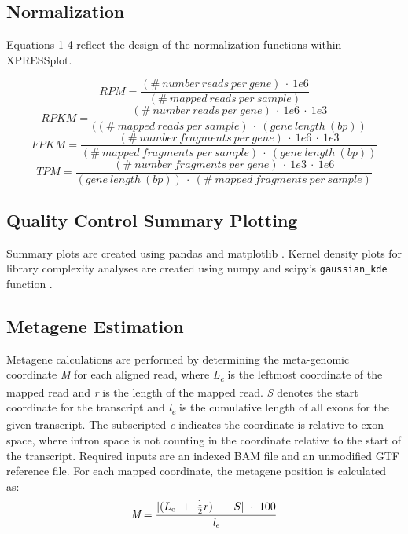 \documentclass[11pt, a4paper, oneside]{article}
\begin{document}
\subsection{Normalization}
Equations 1-4 reflect the design of the normalization functions within XPRESSplot.

  \begin{equation}
    RPM = \frac{(\#\ number\ reads\ per\ gene)\ \cdot\ 1e6}{(\#\ mapped\ reads\ per\ sample)}
  \end{equation}
  \begin{equation}
    RPKM = \frac{(\#\ number\ reads\ per\ gene)\ \cdot\ 1e6\ \cdot\ 1e3}{((\#\ mapped\ reads\ per\ sample)\ \cdot\ (gene\ length\ (bp))}
  \end{equation}
  \begin{equation}
    FPKM = \frac{(\#\ number\ fragments\ per\ gene)\ \cdot\ 1e6\ \cdot\ 1e3}{(\#\ mapped\ fragments\ per\ sample)\ \cdot\ (gene\ length\ (bp))}
  \end{equation}
  \begin{equation}
    TPM = \frac{(\#\ number\ fragments\ per\ gene)\ \cdot\ 1e3\ \cdot\ 1e6}{(gene\ length\ (bp))\ \cdot\ (\#\ mapped\ fragments\ per\ sample)}
  \end{equation}

\subsection{Quality Control Summary Plotting}
Summary plots are created using pandas \cite{pandas} and matplotlib \cite{matplotlib}. Kernel density plots for library complexity analyses are created using numpy \cite{numpy1, numpy2} and scipy's \texttt{gaussian\_kde} function \cite{scipy}.

\subsection{Metagene Estimation}
Metagene calculations are performed by determining the meta-genomic coordinate \textit{M} for each aligned read, where \textit{L\textsubscript{e}} is the leftmost coordinate of the mapped read and \textit{r} is the length of the mapped read. \textit{S} denotes the start coordinate for the transcript and \textit{l\textsubscript{e}} is the cumulative length of all exons for the given transcript. The subscripted \textit{e} indicates the coordinate is relative to exon space, where intron space is not counting in the coordinate relative to the start of the transcript. Required inputs are an indexed BAM file and an unmodified GTF reference file. For each mapped coordinate, the metagene position is calculated as:
\begin{equation}
\textit{M} = \frac{|(L\textsubscript{e}\ +\ \frac{1}{2}r)\ -\ S|\ \cdot\ 100}{\textit{l\textsubscript{e}}}
\end{equation}
\end{document}
